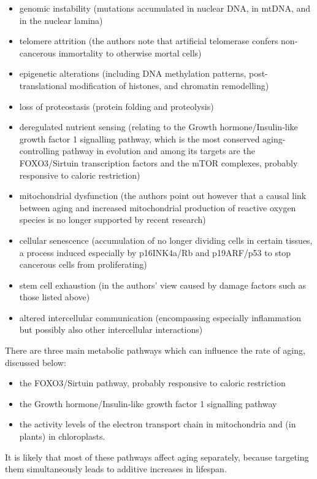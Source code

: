 \begin{itemize}
\tightlist
\item
  genomic instability (mutations accumulated in nuclear DNA, in mtDNA, and in the nuclear lamina)
\item
  telomere attrition (the authors note that artificial telomerase confers non-cancerous immortality to otherwise mortal cells)
\item
  epigenetic alterations (including DNA methylation patterns, post-translational modification of histones, and chromatin remodelling)
\item
  loss of proteostasis (protein folding and proteolysis)
\item
  deregulated nutrient sensing (relating to the Growth hormone/Insulin-like growth factor 1 signalling pathway, which is the most conserved aging-controlling pathway in evolution and among its targets are the FOXO3/Sirtuin transcription factors and the mTOR complexes, probably responsive to caloric restriction)
\item
  mitochondrial dysfunction (the authors point out however that a causal link between aging and increased mitochondrial production of reactive oxygen species is no longer supported by recent research)
\item
  cellular senescence (accumulation of no longer dividing cells in certain tissues, a process induced especially by p16INK4a/Rb and p19ARF/p53 to stop cancerous cells from proliferating)
\item
  stem cell exhaustion (in the authors' view caused by damage factors such as those listed above)
\item
  altered intercellular communication (encompassing especially inflammation but possibly also other intercellular interactions)
\end{itemize}

There are three main metabolic pathways which can influence the rate of aging, discussed below:

\begin{itemize}
\tightlist
\item
  the FOXO3/Sirtuin pathway, probably responsive to caloric restriction
\item
  the Growth hormone/Insulin-like growth factor 1 signalling pathway
\item
  the activity levels of the electron transport chain in mitochondria and (in plants) in chloroplasts.
\end{itemize}

It is likely that most of these pathways affect aging separately, because targeting them simultaneously leads to additive increases in lifespan.


